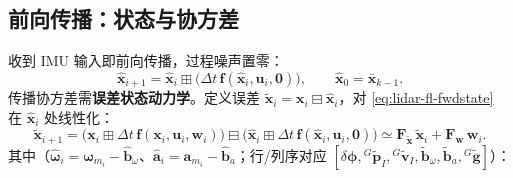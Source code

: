 \subsection{前向传播：状态与协方差}
\label{sec:lidar-fl-fwd}

收到 IMU 输入即前向传播，过程噪声置零\cite{xu2021fastlio}：
\begin{equation}
  \hat{\mathbf{x}}_{i+1}=\hat{\mathbf{x}}_i\boxplus\big(\Delta t\,\mathbf{f}(\hat{\mathbf{x}}_i,\mathbf{u}_i,\mathbf{0})\big),\qquad \hat{\mathbf{x}}_0=\bar{\mathbf{x}}_{k-1}.
  \label{eq:lidar-fl-fwdstate}
\end{equation}
传播协方差需\textbf{误差状态动力学}。定义误差 $\tilde{\mathbf{x}}_i=\mathbf{x}_i\boxminus\hat{\mathbf{x}}_i$，对 \cref{eq:lidar-fl-fwdstate} 在 $\hat{\mathbf{x}}_i$ 处线性化：
\begin{equation}
  \tilde{\mathbf{x}}_{i+1}=\big(\mathbf{x}_i\boxplus\Delta t\,\mathbf{f}(\mathbf{x}_i,\mathbf{u}_i,\mathbf{w}_i)\big)\boxminus\big(\hat{\mathbf{x}}_i\boxplus\Delta t\,\mathbf{f}(\hat{\mathbf{x}}_i,\mathbf{u}_i,\mathbf{0})\big)\simeq\mathbf{F}_{\tilde{\mathbf{x}}}\,\tilde{\mathbf{x}}_i+\mathbf{F}_{\mathbf{w}}\,\mathbf{w}_i.
  \label{eq:lidar-fl-errdyn}
\end{equation}
其中（$\hat{\boldsymbol{\omega}}_i=\boldsymbol{\omega}_{m_i}-\hat{\mathbf{b}}_\omega$、$\hat{\mathbf{a}}_i=\mathbf{a}_{m_i}-\hat{\mathbf{b}}_a$；行/列序对应 $[\delta\boldsymbol{\phi},{}^G\tilde{\mathbf{p}}_I,{}^G\tilde{\mathbf{v}}_I,\tilde{\mathbf{b}}_\omega,\tilde{\mathbf{b}}_a,{}^G\tilde{\mathbf{g}}]$）：
